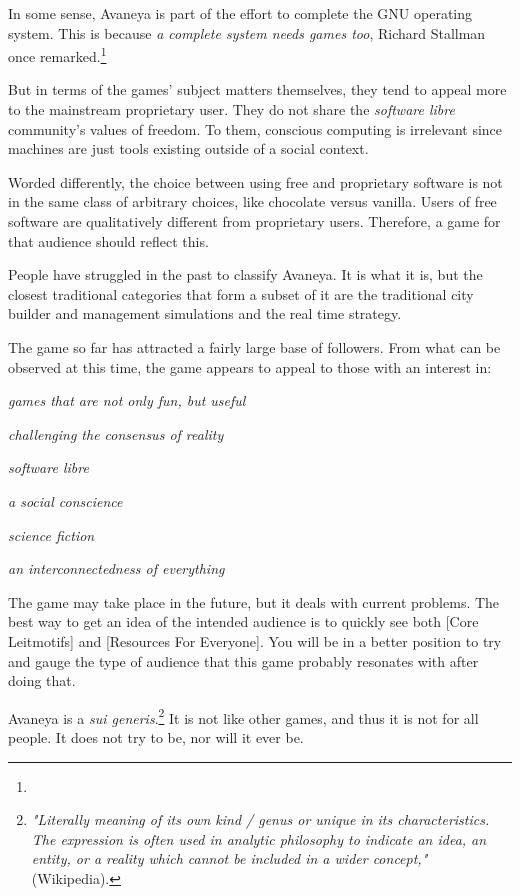 In some sense, Avaneya is part of the effort to complete the GNU operating system. This is because {\it a complete system needs games too}, Richard Stallman once remarked.\footnote{}

But in terms of the games' subject matters themselves, they tend to appeal more to the mainstream proprietary user. They do not share the {\it software libre} community's values of freedom. To them, conscious computing is irrelevant since machines are just tools existing outside of a social context. 

Worded differently, the choice between using free and proprietary software is not in the same class of arbitrary choices, like chocolate versus vanilla. Users of free software are qualitatively different from proprietary users. Therefore, a game for that audience should reflect this.

People have struggled in the past to classify Avaneya. It is what it is, but the closest traditional categories that form a subset of it are the traditional city builder and management simulations and the real time strategy.

The game so far has attracted a fairly large base of followers. From what can be observed at this time, the game appears to appeal to those with an interest in:

\startitemize[3]
\item
{\it games that are not only fun, but useful}
\item
{\it challenging the consensus of reality}
\item
{\it software libre}
\item
{\it a social conscience}
\item
{\it science fiction}
\item
{\it an interconnectedness of everything}
\stopitemize

The game may take place in the future, but it deals with current problems. The best way to get an idea of the intended audience is to quickly see both [Core Leitmotifs] and [Resources For Everyone]. You will be in a better position to try and gauge the type of audience that this game probably resonates with after doing that. 

Avaneya is a {\it sui generis}.\footnote{{\it "Literally meaning of its own kind / genus or unique in its characteristics. The expression is often used in analytic philosophy to indicate an idea, an entity, or a reality which cannot be included in a wider concept,"} (Wikipedia).} It is not like other games, and thus it is not for all people. It does not try to be, nor will it ever be.

